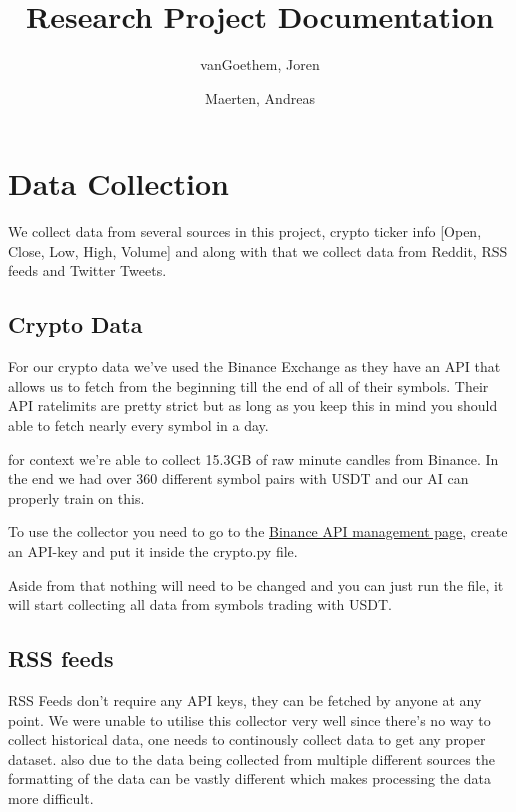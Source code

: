 \documentclass[12pt,a4paper]{article}
\begin{document}
\begin{titlepage}
    \author{
        vanGoethem, Joren
        \and
        Maerten, Andreas
    }
    \title{Research Project Documentation}
\end{titlepage}

\maketitle
\newpage
\tableofcontents
\newpage


\section{Data Collection}

We collect data from several sources in this project, crypto ticker info [Open, Close, Low, High, Volume] and along with that we collect data from Reddit, RSS feeds and Twitter Tweets.

\subsection{Crypto Data}

For our crypto data we've used the Binance Exchange as they have an API that allows us to fetch from the beginning till the end of all of their symbols.
Their API ratelimits are pretty strict but as long as you keep this in mind you should able to fetch nearly every symbol in a day.

for context we're able to collect 15.3GB of raw minute candles from Binance.
In the end we had over 360 different symbol pairs with USDT and our AI can properly train on this.

To use the collector you need to go to the \href{https://www.binance.com/en/my/settings/api-management}{Binance API management page}, create an API-key and put it inside the crypto.py file.

Aside from that nothing will need to be changed and you can just run the file, it will start collecting all data from symbols trading with USDT.

\subsection{RSS feeds}

RSS Feeds don't require any API keys, they can be fetched by anyone at any point. We were unable to utilise this collector very well since there's no way to collect historical data, one needs to continously collect data to get any proper dataset. also due to the data being collected from multiple different sources the formatting of the data can be vastly different which makes processing the data more difficult.
\end{document}
